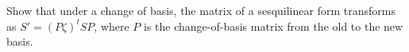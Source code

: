 Show that under a change of basis, the matrix of a sesquilinear form transforms as $S' = (P\zeta)^t S P$, where $P$ is the change-of-basis matrix from the old to the new basis.
